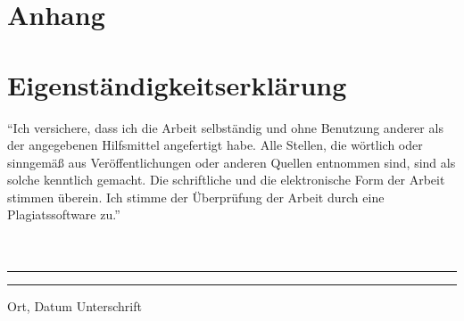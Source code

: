 \documentclass[12pt, a4paper, oneside]{article}
\begin{document}
\newpage


\appendix %
\section{Anhang}

\newpage

\section{Eigenständigkeitserklärung}
``Ich versichere, dass ich die Arbeit selbständig und ohne Benutzung anderer als der angegebenen Hilfsmittel angefertigt habe. Alle Stellen, die wörtlich oder sinngemäß aus Veröffentlichungen oder anderen Quellen entnommen sind, sind als solche kenntlich gemacht. Die schriftliche und die elektronische Form der Arbeit stimmen überein. Ich stimme der Überprüfung der Arbeit durch eine Plagiatssoftware zu.''
\paragraph{}$~~$\\
\paragraph{}$~~$\\
\vspace{50pt} 
\noindent\rule{5cm}{.4pt}\hfill\rule{5cm}{.4pt}\par 
\noindent Ort, Datum \hfill Unterschrift 
\end{document}
